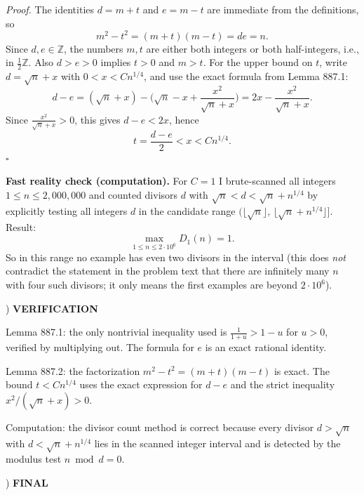 \noindent\emph{Proof.}
The identities $d=m+t$ and $e=m-t$ are immediate from the definitions, so
\[
 m^2-t^2 = (m+t)(m-t)=de=n.
\]
Since $d,e\in\mathbb{Z}$, the numbers $m,t$ are either both integers or both half-integers, i.e., in $\tfrac12\mathbb{Z}$. Also $d>e>0$ implies $t>0$ and $m>t$.
For the upper bound on $t$, write $d=\sqrt n + x$ with $0<x<Cn^{1/4}$, and use the exact formula from Lemma 887.1:
\[
 d-e = (\sqrt n + x) - \Big(\sqrt n - x + \frac{x^2}{\sqrt n + x}\Big)
 = 2x - \frac{x^2}{\sqrt n + x}.
\]
Since $\frac{x^2}{\sqrt n + x}>0$, this gives $d-e<2x$, hence
\[
 t=\frac{d-e}{2} < x < Cn^{1/4}.
\]
\hfill$\square$

\medskip
\noindent \textbf{Fast reality check (computation).}
For $C=1$ I brute-scanned all integers $1\le n\le 2{,}000{,}000$ and counted divisors $d$ with $\sqrt n<d<\sqrt n+n^{1/4}$ by explicitly testing all integers $d$ in the candidate range $(\lfloor\sqrt n\rfloor,\,\lfloor \sqrt n+n^{1/4}\rfloor]$. Result:
\[
\max_{1\le n\le 2\cdot 10^6} D_1(n) = 1.
\]
So in this range no example has even two divisors in the interval (this does \emph{not} contradict the statement in the problem text that there are infinitely many $n$ with four such divisors; it only means the first examples are beyond $2\cdot 10^6$).

) \textbf{VERIFICATION}

\noindent Lemma 887.1: the only nontrivial inequality used is $\frac1{1+u}>1-u$ for $u>0$, verified by multiplying out. The formula for $e$ is an exact rational identity.

\noindent Lemma 887.2: the factorization $m^2-t^2=(m+t)(m-t)$ is exact. The bound $t<Cn^{1/4}$ uses the exact expression for $d-e$ and the strict inequality $x^2/(\sqrt n+x)>0$.

\noindent Computation: the divisor count method is correct because every divisor $d>\sqrt n$ with $d<\sqrt n+n^{1/4}$ lies in the scanned integer interval and is detected by the modulus test $n\bmod d=0$.

) \textbf{FINAL}

